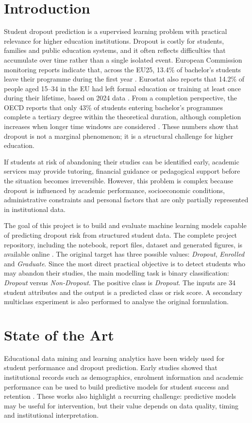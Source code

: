 \documentclass[conference]{IEEEtran}
\begin{document}
\section{Introduction}
Student dropout prediction is a supervised learning problem with practical relevance for higher education institutions. Dropout is costly for students, families and public education systems, and it often reflects difficulties that accumulate over time rather than a single isolated event. European Commission monitoring reports indicate that, across the EU25, 13.4\% of bachelor's students leave their programme during the first year \cite{ec2025monitor}. Eurostat also reports that 14.2\% of people aged 15--34 in the EU had left formal education or training at least once during their lifetime, based on 2024 data \cite{eurostat2025dropout}. From a completion perspective, the OECD reports that only 43\% of students entering bachelor's programmes complete a tertiary degree within the theoretical duration, although completion increases when longer time windows are considered \cite{oecd2025completion}. These numbers show that dropout is not a marginal phenomenon; it is a structural challenge for higher education.

If students at risk of abandoning their studies can be identified early, academic services may provide tutoring, financial guidance or pedagogical support before the situation becomes irreversible. However, this problem is complex because dropout is influenced by academic performance, socioeconomic conditions, administrative constraints and personal factors that are only partially represented in institutional data.

The goal of this project is to build and evaluate machine learning models capable of predicting dropout risk from structured student data. The complete project repository, including the notebook, report files, dataset and generated figures, is available online \cite{github2026project}. The original target has three possible values: \textit{Dropout}, \textit{Enrolled} and \textit{Graduate}. Since the most direct practical objective is to detect students who may abandon their studies, the main modelling task is binary classification: \textit{Dropout} versus \textit{Non-Dropout}. The positive class is \textit{Dropout}. The inputs are 34 student attributes and the output is a predicted class or risk score. A secondary multiclass experiment is also performed to analyse the original formulation.

\section{State of the Art}
Educational data mining and learning analytics have been widely used for student performance and dropout prediction. Early studies showed that institutional records such as demographics, enrolment information and academic performance can be used to build predictive models for student success and retention \cite{kovacic2010early,ames2016dropout}. These works also highlight a recurring challenge: predictive models may be useful for intervention, but their value depends on data quality, timing and institutional interpretation.
\end{document}
